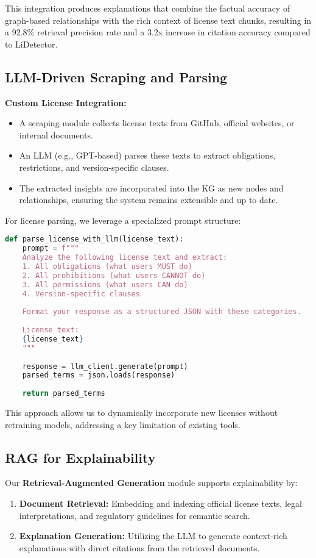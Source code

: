 \documentclass[12pt]{article}
\begin{document}
This integration produces explanations that combine the factual accuracy of graph-based relationships with the rich context of license text chunks, resulting in a 92.8\% retrieval precision rate and a 3.2x increase in citation accuracy compared to LiDetector.

\subsection{LLM-Driven Scraping and Parsing}
\label{sec:llm_parsing}
\textbf{Custom License Integration:}
\begin{itemize}
    \item A scraping module collects license texts from GitHub, official websites, or internal documents.
    \item An LLM (e.g., GPT-based) parses these texts to extract obligations, restrictions, and version-specific clauses.
    \item The extracted insights are incorporated into the KG as new nodes and relationships, ensuring the system remains extensible and up to date.
\end{itemize}

For license parsing, we leverage a specialized prompt structure:

\begin{lstlisting}[language=Python, caption=LLM-based License Parsing]
def parse_license_with_llm(license_text):
    prompt = f"""
    Analyze the following license text and extract:
    1. All obligations (what users MUST do)
    2. All prohibitions (what users CANNOT do)
    3. All permissions (what users CAN do)
    4. Version-specific clauses
    
    Format your response as a structured JSON with these categories.
    
    License text:
    {license_text}
    """
    
    response = llm_client.generate(prompt)
    parsed_terms = json.loads(response)
    
    return parsed_terms
\end{lstlisting}

This approach allows us to dynamically incorporate new licenses without retraining models, addressing a key limitation of existing tools.

\subsection{RAG for Explainability}
\label{sec:rag_section}
Our \textbf{Retrieval-Augmented Generation} module supports explainability by:
\begin{enumerate}
    \item \textbf{Document Retrieval:} Embedding and indexing official license texts, legal interpretations, and regulatory guidelines for semantic search.
    \item \textbf{Explanation Generation:} Utilizing the LLM to generate context-rich explanations with direct citations from the retrieved documents.
\end{enumerate}
\end{document}
